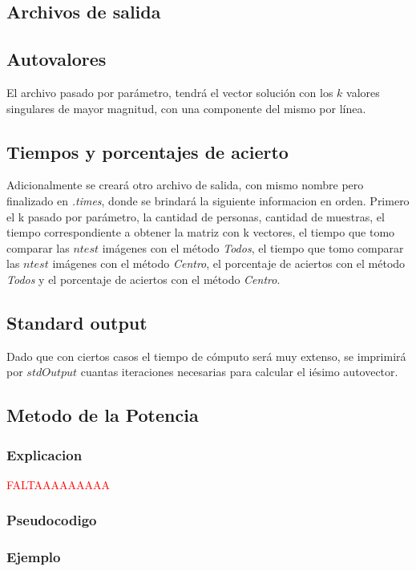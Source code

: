 \subsection{Archivos de salida}
\subsection{Autovalores}
El archivo pasado por par\'ametro, tendr\'a el vector soluci\'on con los $k$ valores singulares de mayor magnitud, con una
componente del mismo por l\'inea.

\subsection{Tiempos y porcentajes de acierto}
Adicionalmente se crear\'a otro archivo de salida, con mismo nombre pero finalizado en \emph{.times}, donde se brindar\'a la siguiente informacion en orden. Primero el k pasado por par\'ametro, la cantidad de personas, cantidad de muestras, el tiempo correspondiente a obtener la matriz con k vectores, el tiempo que tomo comparar las $ntest$ im\'agenes con el m\'etodo \emph{Todos}, el tiempo que tomo comparar las $ntest$ im\'agenes con el m\'etodo \emph{Centro}, el porcentaje de aciertos con el m\'etodo \emph{Todos} y el porcentaje de aciertos con el m\'etodo \emph{Centro}.

\subsection{Standard output}
Dado que con ciertos casos el tiempo de c\'omputo ser\'a muy extenso, se imprimir\'a por $stdOutput$ cuantas iteraciones necesarias para calcular el i\'esimo autovector.

\subsection{Metodo de la Potencia}

\subsubsection{Explicacion}

\textcolor{red}{FALTAAAAAAAAA}

\subsubsection{Pseudocodigo}

\subsubsection{Ejemplo}


